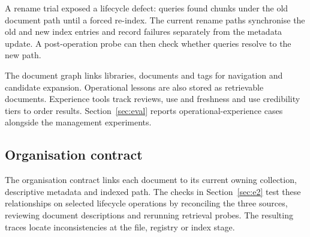 A rename trial exposed a lifecycle defect: queries found chunks under the
old document path until a forced re-index. The current rename paths
synchronise the old and new index entries and record failures separately
from the metadata update. A post-operation probe can then check whether
queries resolve to the new path.

The document graph links libraries, documents and tags for navigation and
candidate expansion. Operational lessons are also stored as retrievable
documents. Experience tools track reviews, use and freshness and use
credibility tiers to order results. Section~\ref{sec:eval} reports
operational-experience cases alongside the management experiments.

\subsection{Organisation contract}
\label{sec:org-integrity}
\label{sec:org-summary}

The organisation contract links each document to its current owning
collection, descriptive metadata and indexed path. The checks in
Section~\ref{sec:e2} test these relationships on selected lifecycle
operations by reconciling the three sources, reviewing document descriptions
and rerunning retrieval probes. The resulting traces locate inconsistencies
at the file, registry or index stage.
